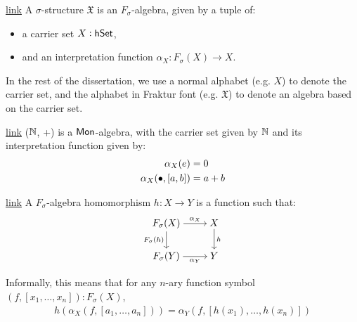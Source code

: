 \begin{definition}{\href{https://windtfw.com/agda-symmetries/Cubical.Structures.Str.html#555}{link}}\label{algebra:struct}
    A $\sigma$-structure $\mathfrak{X}$ is an $F_\sigma$-algebra, given by a tuple
    of:
    \begin{itemize}
        \item a carrier set $X : \mathsf{hSet}$,
        \item and an interpretation function $\alpha_X : F_\sigma(X) \to X$.
    \end{itemize}
\end{definition}

In the rest of the dissertation, we use a normal alphabet
(e.g. $X$) to denote the carrier set, and the alphabet in Fraktur font
(e.g. $\mathfrak{X}$) to denote an algebra based on the carrier set.

\begin{example}{\href{https://windtfw.com/agda-symmetries/Cubical.Structures.Set.Mon.Desc.html#6276}{link}}
($\mathbb{N}$, +) is a $\operatorname{\mathsf{Mon}}$-algebra, with
the carrier set given by $\mathbb{N}$ and its interpretation function given by:
\begin{align*}
    \alpha_X(e) & = 0 \\
    \alpha_X(\mathbin{\bullet}, [a, b]) & = a + b
\end{align*}
\end{example}

\begin{definition}{\href{https://windtfw.com/agda-symmetries/Cubical.Structures.Str.html#1013}{link}}
    A $F_\sigma$-algebra homomorphism $h: X \rightarrow Y$ is a function such that:
\[\begin{tikzcd}[ampersand replacement=\&,cramped]
	{F_{\sigma}(X)} \& X \\
	{F_{\sigma}(Y)} \& Y
	\arrow["{\alpha_X}", from=1-1, to=1-2]
	\arrow["{F_{\sigma}(h)}"', from=1-1, to=2-1]
	\arrow["{\alpha_Y}"', from=2-1, to=2-2]
	\arrow["h", from=1-2, to=2-2]
\end{tikzcd}\]
\end{definition}

Informally, this means that for any $n$-ary function symbol $(f, [x_1, \dots, x_n]) : F_{\sigma}(X)$,
\begin{align*}
    h(\alpha_X(f, [a_1, \dots, a_n])) = \alpha_Y(f, [h(x_1), \dots, h(x_n)])
\end{align*}

